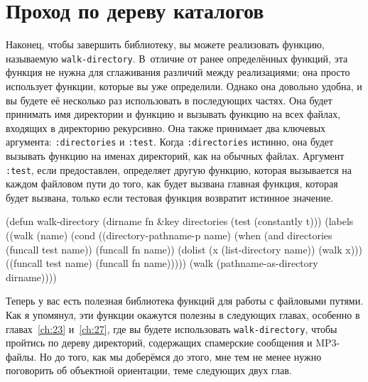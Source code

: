 \section{Проход по дереву каталогов}

Наконец, чтобы завершить библиотеку, вы можете реализовать функцию, называемую
\lstinline{walk-directory}. В~отличие от ранее определённых функций, эта функция не нужна для
сглаживания различий между реализациями; она просто использует функции, которые вы уже
определили. Однако она довольно удобна, и вы будете её несколько раз использовать в
последующих частях. Она будет принимать имя директории и функцию и вызывать функцию на
всех файлах, входящих в директорию рекурсивно. Она также принимает два ключевых аргумента:
\lstinline{:directories} и \lstinline{:test}. Когда \lstinline{:directories} истинно, она будет вызывать
функцию на именах директорий, как на обычных файлах. Аргумент \lstinline{:test}, если
предоставлен, определяет другую функцию, которая вызывается на каждом файловом пути до
того, как будет вызвана главная функция, которая будет вызвана, только если тестовая
функция возвратит истинное значение.

\begin{myverb}
(defun walk-directory (dirname fn &key directories (test (constantly t)))
  (labels
      ((walk (name)
         (cond
           ((directory-pathname-p name)
            (when (and directories (funcall test name))
              (funcall fn name))
            (dolist (x (list-directory name)) (walk x)))
           ((funcall test name) (funcall fn name)))))
    (walk (pathname-as-directory dirname))))
\end{myverb}

Теперь у вас есть полезная библиотека функций для работы с файловыми путями. Как я
упомянул, эти функции окажутся полезны в следующих главах, особенно в главах~\ref{ch:23}
и~\ref{ch:27}, где вы будете использовать \lstinline{walk-directory}, чтобы пройтись по
дереву директорий, содержащих спамерские сообщения и MP3-файлы. Но до того, как мы
доберёмся до этого, мне тем не менее нужно поговорить об объектной ориентации, теме
следующих двух глав.


